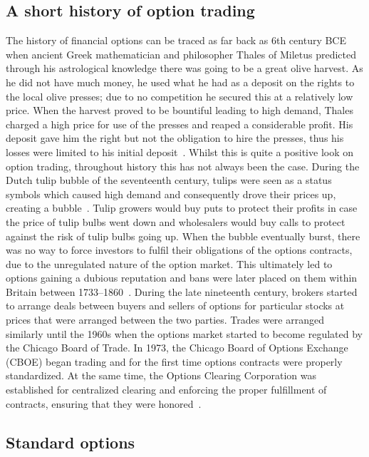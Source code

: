 \subsection{A short history of option trading}
The history of financial options can be traced as far back as 6th century BCE when ancient Greek mathematician and philosopher Thales of Miletus predicted through his astrological knowledge there was going to be a great olive harvest. As he did not have much money, he used what he had as a deposit on the rights to the local olive presses; due to no competition he secured this at a relatively low price. When the harvest proved to be bountiful leading to high demand, Thales charged a high price for use of the presses and reaped a considerable profit. His deposit gave him the right but not the obligation to hire the presses, thus his losses were limited to his initial deposit~\cite{OptionFirst, 1877aristotle}.
\nline{}
Whilst this is quite a positive look on option trading, throughout history this has not always been the case. During the Dutch tulip bubble of the seventeenth century, tulips were seen as a status symbols which caused high demand and consequently drove their prices up, creating a bubble~\cite{dash2011tulipomania}. Tulip growers would buy puts to protect their profits in case the price of tulip bulbs went down and wholesalers would buy calls to protect against the risk of tulip bulbs going up. When the bubble eventually burst, there was no way to force investors to fulfil their obligations of the options contracts, due to the unregulated nature of the option market. This ultimately led to options gaining a dubious reputation and bans were later placed on them within Britain between 1733--1860~\cite{OptionBan}. 
\nline{}
During the late nineteenth century, brokers started to arrange deals between buyers and sellers of options for particular stocks at prices that were arranged between the two parties. Trades were arranged similarly until the 1960s when the options market started to become regulated by the Chicago Board of Trade. In 1973, the Chicago Board of Options Exchange (CBOE) began trading and for the first time options contracts were properly standardized. At the same time, the Options Clearing Corporation was established for centralized clearing and enforcing the proper fulfillment of contracts, ensuring that they were honored~\cite{markham2002financial}.

\subsection{Standard options}

